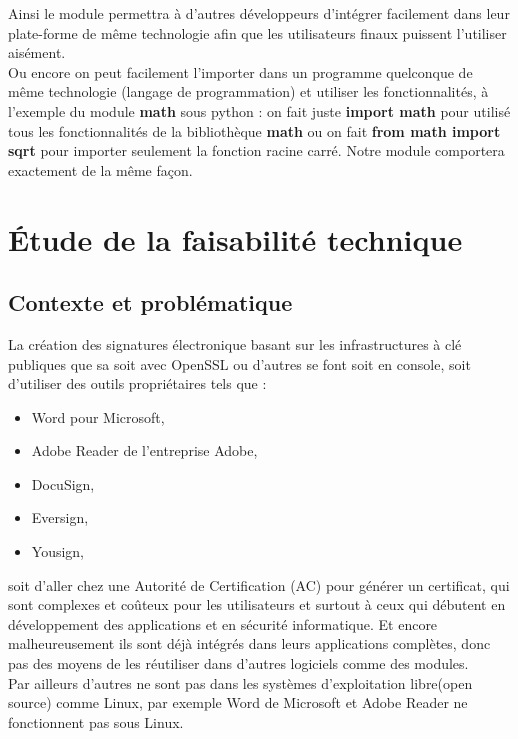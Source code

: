 \documentclass[12pt,a4paper]{article}
\begin{document}
	 Ainsi le module permettra à d'autres développeurs d'intégrer facilement dans leur plate-forme de même technologie afin que les utilisateurs finaux puissent l'utiliser aisément.\\
	 
	 Ou encore on peut facilement l'importer dans un programme quelconque de même technologie (langage de programmation) et utiliser les fonctionnalités, à l'exemple du module \textbf{math} sous python : on fait juste \textbf{import math} pour utilisé tous les fonctionnalités de la bibliothèque \textbf{math} ou on fait \textbf{from math import sqrt } pour importer seulement la fonction racine carré. Notre module comportera exactement de la même façon.

\section{Étude de la faisabilité technique}
	\subsection{Contexte et problématique} 
	
		La création des signatures électronique basant sur les infrastructures à clé publiques que sa soit avec OpenSSL ou d'autres se font soit en console, soit d'utiliser des outils propriétaires tels que :
		\begin{itemize}
			\item Word pour Microsoft,
			\item Adobe Reader de l'entreprise Adobe,
			\item DocuSign,
			\item Eversign,
			\item Yousign,\\
		\end{itemize}
		
		soit d'aller chez une Autorité de Certification (AC) pour générer un certificat, qui sont complexes et coûteux pour les utilisateurs et surtout à ceux qui débutent en développement des applications et en sécurité informatique. Et encore malheureusement ils sont déjà intégrés dans leurs applications complètes, donc pas des moyens de les réutiliser dans  d'autres logiciels comme des modules.\\
		
		Par ailleurs d'autres ne sont pas dans les systèmes d'exploitation libre(open source) comme Linux, par exemple Word de Microsoft et Adobe Reader ne fonctionnent pas sous Linux. 
		
\end{document}
